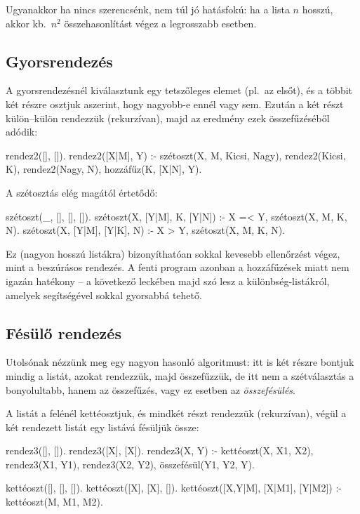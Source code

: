 Ugyanakkor ha nincs szerencsénk, nem túl jó
hatásfokú: ha a lista $n$ hosszú, akkor kb.~$n^2$
összehasonlítást végez a legrosszabb esetben.

\subsection*{Gyorsrendezés}
A gyorsrendezésnél kiválasztunk egy tetszőleges
elemet (pl.~az elsőt), és a többit két részre
osztjuk aszerint, hogy nagyobb-e ennél vagy
sem. Ezután a két részt külön--külön rendezzük
(rekurzívan), majd az eredmény ezek összefűzéséből
adódik:
\begin{program}
rendez2([], []).
rendez2([X|M], Y) :-
    szétoszt(X, M, Kicsi, Nagy),
    rendez2(Kicsi, K),
    rendez2(Nagy, N),
    hozzáfűz(K, [X|N], Y).
\end{program}
A szétosztás elég magától értetődő:
\begin{program}
szétoszt(_, [], [], []).
szétoszt(X, [Y|M], K, [Y|N]) :-
    X =< Y, szétoszt(X, M, K, N).
szétoszt(X, [Y|M], [Y|K], N) :-
    X > Y, szétoszt(X, M, K, N).
\end{program}

Ez (nagyon hosszú listákra) bizonyíthatóan sokkal
kevesebb ellenőrzést végez, mint a beszúrásos
rendezés. A fenti program azonban a hozzáfűzések
miatt nem igazán hatékony -- a következő leckében
majd szó lesz a különbség-listákról, amelyek
segítségével sokkal gyorsabbá tehető.

\subsection*{Fésülő rendezés}
Utolsónak nézzünk meg egy nagyon hasonló
algoritmust: itt is két részre bontjuk mindig a
listát, azokat rendezzük, majd összefűzzük, de itt
nem a szétválasztás a bonyolultabb, hanem az
összefűzés, vagy ez esetben az \emph{összefésülés}.

A listát a felénél kettéosztjuk, és mindkét részt
rendezzük (rekurzívan), végül a két rendezett listát
egy listává fésüljük össze:
\begin{program}
rendez3([], []).
rendez3([X], [X]).
rendez3(X, Y) :-
    kettéoszt(X, X1, X2),
    rendez3(X1, Y1),
    rendez3(X2, Y2),
    összefésül(Y1, Y2, Y).

kettéoszt([], [], []).
kettéoszt([X], [X], []).
kettéoszt([X,Y|M], [X|M1], [Y|M2]) :-
    kettéoszt(M, M1, M2).
\end{program}

